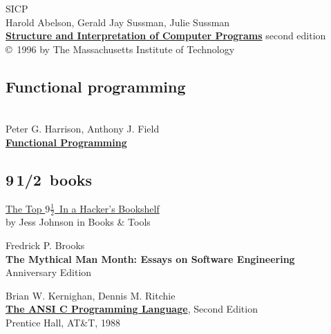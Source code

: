 \begin{thebibliography}{9}
 SICP
\\
Harold Abelson, Gerald Jay Sussman, Julie Sussman\\
\textbf{\href{https://mitpress.mit.edu/sicp/full-text/book/book.html}{Structure
and Interpretation of Computer Programs}} second edition\\
\copyright\ 1996 by The Massachusetts Institute of Technology

\subsection*{Functional programming}

\\
Peter G. Harrison, Anthony J. Field\\
\textbf{\href{http://www.amazon.com/Functional-Programming-International-Computer-Science/dp/0201192497}{Functional Programming}}

\subsection*{9\,1/2\ books}

\href{http://grokcode.com/11/the-top-9-in-a-hackers-bookshelf/}{The Top
$9\frac{1}{2}$\ In a Hacker’s Bookshelf}\\
by Jess Johnson	in Books \& Tools

 Fredrick P. Brooks\\
\textbf{The Mythical Man Month: Essays on Software Engineering}\\
Anniversary Edition

 Brian W. Kernighan, Dennis M. Ritchie\\
\textbf{\href{https://hassanolity.files.wordpress.com/2013/11/the_c_programming_language_2.pdf}{The ANSI C Programming Language}}, Second Edition\\
Prentice Hall, AT\&T, 1988 

\end{thebibliography}
